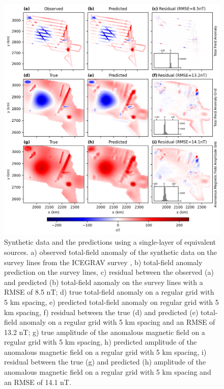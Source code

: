 \begin{figure}[tb!]
\centering
\includegraphics[width=1\linewidth]{figures/single_layer_synthetic.png}
\caption{
    Synthetic data and the predictions using a single-layer of equivalent sources. a) observed total-field anomaly of the synthetic data on the survey lines from the ICEGRAV survey \citep{ICEGRAV_data}, b) total-field anomaly prediction on the survey lines, c) residual between the observed (a) and predicted (b) total-field anomaly on the survey lines with a RMSE of 8.5 nT; d) true total-field anomaly on a regular grid with 5 km spacing, e) predicted total-field anomaly on regular grid with 5 km spacing, f) residual between the true (d) and predicted (e) total-field anomaly on a regular grid with 5 km spacing and an RMSE of 13.2 nT; g) true amplitude of the anomalous magnetic field on a regular grid with 5 km spacing, h) predicted amplitude of the anomalous magnetic field on a regular grid with 5 km spacing, i) residual between the true (g) and predicted (h) amplitude of the anomalous magnetic field on a regular grid with 5 km spacing and an RMSE of 14.1 nT.
}
\label{fig:single_layer_synthetic}
\end{figure}

